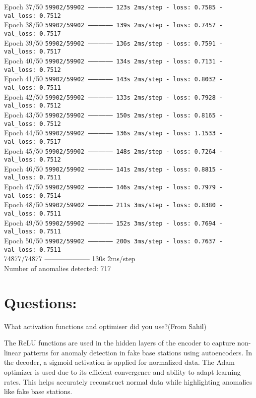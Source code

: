 Epoch 37/50
\texttt{59902/59902 -------------------- 123s 2ms/step - loss: 0.7585 - val\_loss: 0.7512}\\
Epoch 38/50
\texttt{59902/59902 -------------------- 139s 2ms/step - loss: 0.7457 - val\_loss: 0.7517}\\
Epoch 39/50
\texttt{59902/59902 -------------------- 136s 2ms/step - loss: 0.7591 - val\_loss: 0.7517}\\
Epoch 40/50
\texttt{59902/59902 -------------------- 134s 2ms/step - loss: 0.7131 - val\_loss: 0.7512}\\
Epoch 41/50
\texttt{59902/59902 -------------------- 143s 2ms/step - loss: 0.8032 - val\_loss: 0.7511}\\
Epoch 42/50
\texttt{59902/59902 -------------------- 133s 2ms/step - loss: 0.7928 - val\_loss: 0.7512}\\
Epoch 43/50
\texttt{59902/59902 -------------------- 150s 2ms/step - loss: 0.8165 - val\_loss: 0.7512}\\
Epoch 44/50
\texttt{59902/59902 -------------------- 136s 2ms/step - loss: 1.1533 - val\_loss: 0.7517}\\
Epoch 45/50
\texttt{59902/59902 -------------------- 148s 2ms/step - loss: 0.7264 - val\_loss: 0.7512}\\
Epoch 46/50
\texttt{59902/59902 -------------------- 141s 2ms/step - loss: 0.8815 - val\_loss: 0.7511}\\
Epoch 47/50
\texttt{59902/59902 -------------------- 146s 2ms/step - loss: 0.7979 - val\_loss: 0.7514}\\
Epoch 48/50
\texttt{59902/59902 -------------------- 211s 3ms/step - loss: 0.8380 - val\_loss: 0.7511}\\
Epoch 49/50
\texttt{59902/59902 -------------------- 152s 3ms/step - loss: 0.7694 - val\_loss: 0.7511}\\
Epoch 50/50
\texttt{59902/59902 -------------------- 200s 3ms/step - loss: 0.7637 - val\_loss: 0.7511}\\
74877/74877 -------------------- 130s 2ms/step\\
Number of anomalies detected: 717

\section*{Questions: }
What activation functions and optimiser did you use?(From Sahil)

The ReLU  functions are used in the hidden layers of the encoder to capture non-linear patterns for anomaly detection in fake base stations using autoencoders. In the decoder, a sigmoid activation is  applied for normalized data. The Adam optimizer is  used due to its efficient convergence and ability to adapt learning rates. This helps  accurately reconstruct normal data while highlighting anomalies like fake base stations.

